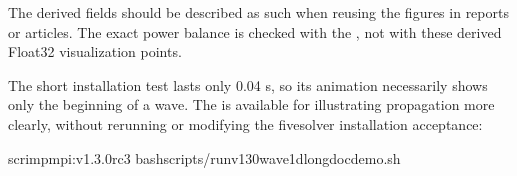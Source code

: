 \documentclass[letterpaper,10pt,english]{sphinxmanual}
\begin{document}
\begin{sphinxVerbatim}[commandchars=\\\{\}]

   
      \PYG{p}{[}\PYG{p}{]}                 
      \PYG{p}{[}\PYG{p}{]}               
      \PYG{p}{[}\PYG{p}{]}                 
      \PYG{p}{[}\PYG{p}{]}          
      \PYG{p}{[}\PYG{p}{]}                 
\end{sphinxVerbatim}

\sphinxAtStartPar
The derived fields should be described as such when
reusing the figures in reports or articles. The exact
power balance is checked with the , not with these derived
Float32 visualization points.

\sphinxAtStartPar
The short installation test lasts only 0.04 s, so its
animation necessarily shows only the beginning of a wave.
The  is available for illustrating propagation
more clearly, without rerunning or modifying the five\sphinxhyphen{}solver
installation acceptance:

\begin{sphinxVerbatim}[commandchars=\\\{\}]
scrimp\PYGZhy{}mpi:v1.3.0\PYGZhy{}rc3
bashscripts/run\PYGZhy{}v130\PYGZhy{}wave1d\PYGZhy{}long\PYGZhy{}doc\PYGZhy{}demo.sh
\end{sphinxVerbatim}
\end{document}
